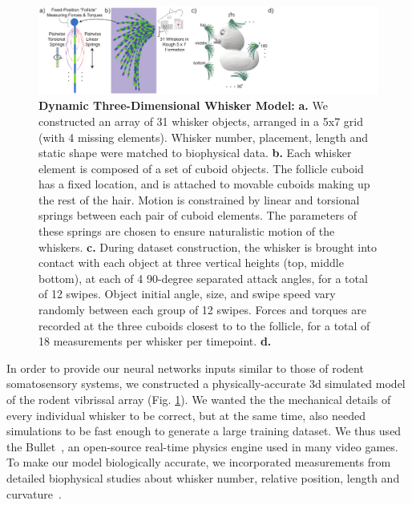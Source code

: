 \begin{figure}
\centering
\includegraphics [width=1\linewidth]{figures/whiskers.pdf}
\vspace{-2mm}
\caption{\textbf{Dynamic Three-Dimensional Whisker Model:} \textbf{a.} We constructed an array of 31 whisker objects, arranged in a 5x7 grid (with 4 missing elements).  
Whisker number, placement, length and static shape were matched to biophysical data. 
\textbf{b.} Each whisker element is composed of a set of cuboid objects.  
The follicle cuboid has a fixed location, and is attached to movable cuboids making up the rest of the hair. 
Motion is constrained by linear and torsional springs between each pair of cuboid elements.  
The parameters of these springs are chosen to ensure naturalistic motion of the whiskers.  
\textbf{c.} During dataset construction, the whisker is brought into contact with each object at three vertical heights (top, middle bottom), at each of 4 90-degree separated attack angles, for a total of 12 swipes.  
Object initial angle, size, and swipe speed vary randomly between each group of 12 swipes.
Forces and torques are recorded at the three cuboids closest to to the follicle, for a total of 18 measurements per whisker per timepoint. 
\textbf{d.} ~\label{fig_whiskers}}
\end{figure}

In order to provide our neural networks inputs similar to those of rodent somatosensory systems, we constructed a physically-accurate 3d simulated model of the rodent vibrissal array (Fig. \ref{fig_whiskers}).  
We wanted the the mechanical details of every individual whisker to be correct, but at the same time, also needed simulations to be fast enough to generate a large training dataset.   
We thus used the Bullet~\cite{wiki:bullet}, an open-source real-time physics engine used in many video games. 
To make our model biologically accurate, we incorporated measurements from detailed biophysical studies about whisker number, relative position, length and curvature~\cite{Towal2011}.


